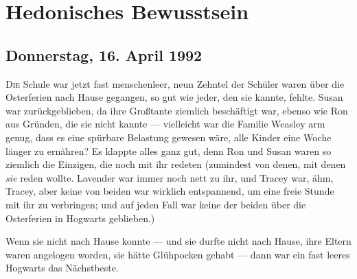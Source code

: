 \chapter{Hedonisches Bewusstsein}

\section{Donnerstag, 16. April 1992}

\lettrine{D}{ie} Schule war jetzt fast menschenleer, neun Zehntel der Schüler waren über die Osterferien nach Hause gegangen, so gut wie jeder, den sie kannte, fehlte. Susan war zurückgeblieben, da ihre Großtante ziemlich beschäftigt war, ebenso wie Ron aus Gründen, die sie nicht kannte — vielleicht war die Familie Weasley arm genug, dass es eine spürbare Belastung gewesen wäre, alle Kinder eine Woche länger zu ernähren?
Es klappte alles ganz gut, denn Ron und Susan waren so ziemlich die Einzigen, die noch mit ihr redeten (zumindest von denen, mit denen \emph{sie} reden wollte. Lavender war immer noch nett zu ihr, und Tracey war, ähm, Tracey, aber keine von beiden war wirklich entspannend, um eine freie Stunde mit ihr zu verbringen; und auf jeden Fall war keine der beiden über die Osterferien in Hogwarts geblieben.)

Wenn sie nicht nach Hause konnte — und sie durfte nicht nach Hause, ihre Eltern waren angelogen worden, sie hätte Glühpocken gehabt — dann war ein fast leeres Hogwarts das Nächstbeste.

